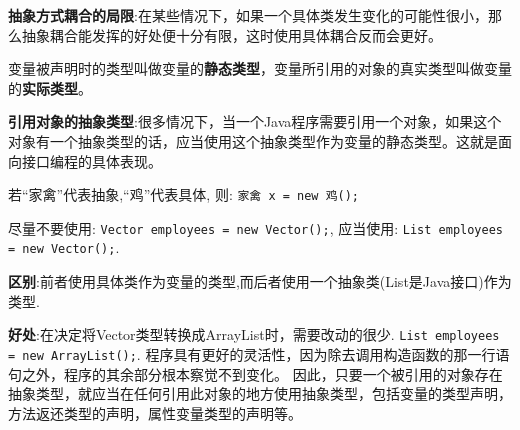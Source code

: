 \documentclass[../main.tex]{subfiles}
\begin{document}
\noindent \textbf{抽象方式耦合的局限}:在某些情况下，如果一个具体类发生变化的可能性很小，那么抽象耦合能发挥的好处便十分有限，这时使用具体耦合反而会更好。

\noindent 变量被声明时的类型叫做变量的\textbf{静态类型}，变量所引用的对象的真实类型叫做变量的\textbf{实际类型}。

\noindent \textbf{引用对象的抽象类型}:很多情况下，当一个Java程序需要引用一个对象，如果这个对象有一个抽象类型的话，应当使用这个抽象类型作为变量的静态类型。这就是面向接口编程的具体表现。

\noindent 若``家禽''代表抽象,``鸡''代表具体, 则: \texttt{家禽 x = new 鸡();}

\noindent 尽量不要使用: \texttt{Vector employees = new Vector();},
应当使用: \texttt{List employees = new Vector();}.

\noindent \textbf{区别}:前者使用具体类作为变量的类型,而后者使用一个抽象类(List是Java接口)作为类型.

\noindent \textbf{好处}:在决定将Vector类型转换成ArrayList时，需要改动的很少.
\texttt{List employees = new ArrayList();}.
程序具有更好的灵活性，因为除去调用构造函数的那一行语句之外，程序的其余部分根本察觉不到变化。
因此，只要一个被引用的对象存在抽象类型，就应当在任何引用此对象的地方使用抽象类型，包括变量的类型声明，方法返还类型的声明，属性变量类型的声明等。
%
\end{document}
